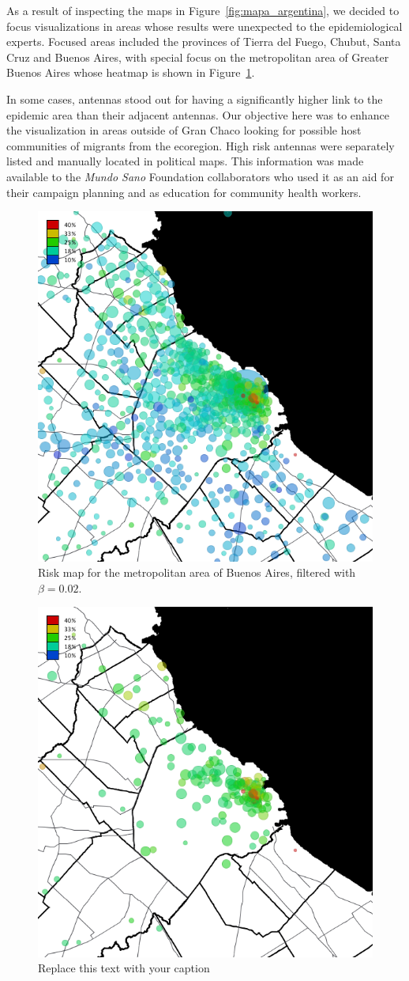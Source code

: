 As a result of inspecting the maps in Figure~\ref{fig:mapa_argentina}, we decided to 
focus visualizations in areas whose results were unexpected to the epidemiological experts. 
Focused areas included the provinces of Tierra del Fuego, Chubut, Santa Cruz and Buenos Aires, with special focus on the metropolitan area of Greater Buenos Aires whose heatmap is shown in Figure~\ref{fig:amba_map}.

In some cases, antennas stood out for having a significantly higher link to the epidemic area than their adjacent antennas. Our objective here was to enhance the visualization in areas outside of Gran Chaco looking for possible host communities of migrants from the ecoregion.
High risk antennas were separately listed and manually located in political maps. This information was made available to the \textit{Mundo Sano} Foundation collaborators who used it as an aid for their campaign planning and as education for community health workers. 


\begin{figure}[p]
\centering
\includegraphics[width=0.75\linewidth]
{figures/201112_hi_res_amba_usuarios_proporcion_circulos_beta2/201112_hi_res_amba_usuarios_proporcion_circulos_beta2}
\caption{Risk map for the metropolitan area of Buenos Aires, filtered with $\beta = 0.02$.}
\label{fig:amba_map}
\end{figure}

\begin{figure}[h!]
\begin{center}
\includegraphics[width=0.35\columnwidth]{figures/201112_hi_res_amba_usuarios_proporcion_circulos_beta20/201112_hi_res_amba_usuarios_proporcion_circulos_beta20}
\caption{Replace this text with your caption%
}
\end{center}
\end{figure}

